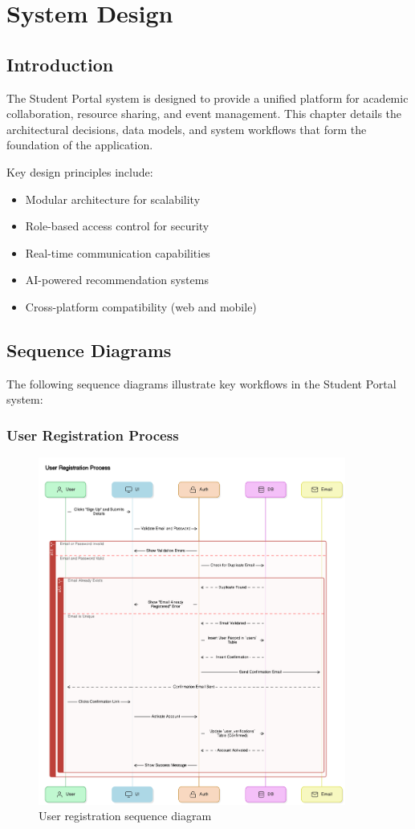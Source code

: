 \chapter{System Design}
\section{Introduction}
The Student Portal system is designed to provide a unified platform for academic collaboration, resource sharing, and event management. This chapter details the architectural decisions, data models, and system workflows that form the foundation of the application.

Key design principles include:
\begin{itemize}
    \item Modular architecture for scalability
    \item Role-based access control for security
    \item Real-time communication capabilities
    \item AI-powered recommendation systems
    \item Cross-platform compatibility (web and mobile)
\end{itemize}

\section{Sequence Diagrams}
The following sequence diagrams illustrate key workflows in the Student Portal system:

\subsection{User Registration Process}
\begin{figure}[H]
    \includegraphics[width=0.9\textwidth]{images/sequence_diagrams/user_registration_process.png}
    \caption{User registration sequence diagram}
    \label{fig:user_registration}
\end{figure}

